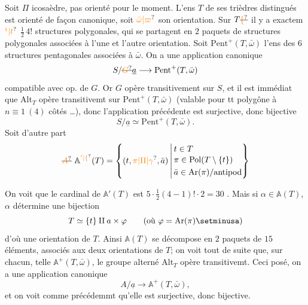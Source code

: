 Soit $\Pi$ icosaèdre,  pas orienté pour le moment. L'ens $T$ de ses trièdres distingués est orienté de façon canonique, soit $\unsure{\bar\omega|\varpi}$ son orientation. Sur $T\deleted{\unsure{\{}}$ il y a exactem$\unsure{^{\mathrm t}|t}$ $\frac12\,4!$  structures polygonales, qui se partagent en $2$ paquets de  structures polygonales associées à l'une et l'autre orientation. Soit $\mathrm{Pent}^+(T,\bar\omega)$ l'ens des $6$ structures pentagonales associées à $\bar\omega$. On a une application canonique
\[
S/\deleted{\unsure{G}}\underline a\longrightarrow\mathrm{Pent}^+(T,\bar\omega)
\]
compatible avec op. de $G$. Or $G$ opère transitivement sur $S$, et il est immédiat que $\mathrm{Alt}_T$ opère transitivemt sur $\mathrm{Pent}^+(T,\bar\omega)$ (valable pour tt polygône à $n\equiv1\ (4)$ côtés \ldots), donc l'application précédente est surjective, donc bijective
\[
S/\underline a\simeq\mathrm{Pent}^+(T,\bar\omega).
\]
Soit d'autre part
\[
\deleted{\unsure{A}}\ \mathbb A^{\unsure{'|\{}}(T)=
\left\{(t,\unsure{\pi|\Pi|\gamma},\bar a)\,\middle|\,
\begin{aligned}
&t\in T\\[-2pt]
&\pi\in\mathrm{Pol}(T\setminus\{t\})\\
&\bar a\in\mathrm{Ar}(\pi)/\mathrm{antipod}
\end{aligned}\right\}
\]

On voit que le cardinal de $\mathbb A'(T)$ est $5\cdot\frac12(4-1)!\cdot2=30$ . Mais si $\alpha\in\mathbb A(T)$, $\alpha$ détermine une bijection
\[
T\simeq\{t\}\amalg a\times\varphi\qquad
(\text{où }\varphi=\mathrm{Ar}(\pi)\setminusa)
\]
d'où une orientation de $T$. Ainsi $\mathbb A(T)$ se décompose en $2$ paquets de $15$ éléments, associés aux deux orientations \inserted{$\unsure{\bar\omega|\varpi},-\bar\omega$} de $T$; on voit tout de suite que, sur chacun, telle $\mathbb A^+(T,\bar\omega)$, le groupe alterné $\mathrm{Alt}_T$ opère transitivemt. Ceci posé, on a une application canonique
\[
 A/\underline a\longrightarrow\mathbb A^+(T,\bar\omega),
\]
 et on voit comme précédemmt qu'elle est surjective, donc bijective.

